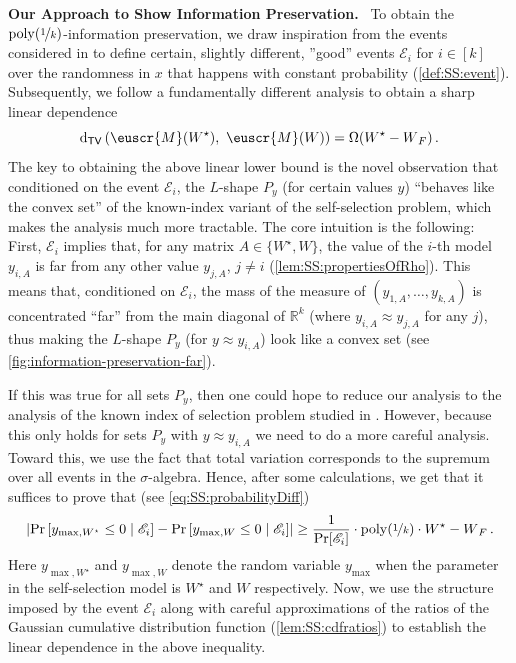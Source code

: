\documentclass[11pt,letterpaper]{article}
\theoremstyle{plain}
\theoremstyle{definition}
\theoremstyle{remark}
\def\abs#1{\left| #1 \right|}
\newcommand{\inparen}[1]{\ensuremath{\left(#1\right)}}
\newcommand{\insquare}[1]{\ensuremath{\left[#1\right]}}
\let\norm\relax
\newcommand{\norm}[1]{\ensuremath{\left\lVert #1 \right\rVert}}
\newcommand{\R}{\mathbb{R}}
\newcommand{\evE}{\ensuremath{\mathscr{E}}}
\newcommand{\tv}[2]{\operatorname{d}_{\mathsf{TV}}{\inparen{#1,#2}}}
\newcommand{\nfrac}[2]{\nicefrac{#1}{#2}}
\newcommand{\poly}{\mathrm{poly}}
\newcommand{\customcal}[1]{\euscr{#1}}
\newcommand{\cM}{\customcal{M}}
\renewcommand{\paragraph}[1]{\medskip \noindent\textbf{#1}~}
\newcommand{\Wstar}{{W^\star}}
\newcommand{\ymax}{y_{\max}}
\begin{document}
    \paragraph{Our Approach to Show Information Preservation.}
    To obtain the $\poly(\nfrac{1}{k})$-information preservation, 
    we draw inspiration from the events considered in \cite{gaitonde2024selfselection} to define certain, slightly different, ''good'' events $\evE_i$ for $i\in [k]$
    over the randomness in $x$ that happens with constant probability (\cref{def:SS:event}).
    Subsequently, we follow a fundamentally different analysis to obtain a sharp linear dependence
    \[
        \tv{\cM(\Wstar)}{~\cM(W)}=\Omega(\norm{\Wstar-W}_F)\,.
    \]
    {The key to obtaining the above linear lower bound is the novel observation that conditioned} on the event $\evE_i$, 
    the $L$-shape $P_y$ {(for certain values $y$)} ``behaves like the convex set'' of the known-index variant of the self-selection problem, which makes the analysis much more tractable.
  {The core intuition} is the following:
    First, $\evE_i$ implies that, for any matrix $A \in \{W^\star, W\}$, 
    the value of the $i$-th model $y_{i, A}$ is far from any other value $y_{j, A}$, $j \neq i$ (\cref{lem:SS:propertiesOfRho}). 
    This means that, conditioned on $\evE_i$, the mass of the measure of $(y_{1,A},\dots,y_{k,A})$ is concentrated ``far'' from the main diagonal of $\R^k$ (where $y_{i,A} \approx y_{j,A}$ for any $j$), thus making the $L$-shape {$P_y$ (for $y\approx y_{i, A}$)}  look like a convex set (see \cref{fig:information-preservation-far}).
    
    {If this was true for all sets $P_y$, then one could hope to reduce our analysis to the analysis of the known index of selection problem studied in \cite{cherapanamjeri2023selfselection}.
    However, because this only holds for sets $P_y$ with  $y\approx y_{i, A}$ we need to do a more careful analysis.}
    {Toward this,} we use the fact that total variation corresponds to the supremum over all events in the $\sigma$-algebra. 
    Hence, {after some calculations,} we get that it suffices to prove that (see \cref{eq:SS:probabilityDiff})
    \[
       \abs{
                \Pr\insquare{y_{\max, W^\star} \leq 0\mid \evE_i}
                -
                \Pr\insquare{y_{\max, W} \leq 0\mid \evE_i}
            }
            \geq 
            \frac{1}{\Pr[\evE_i]}
            \cdot \poly{(\nfrac{1}{k})}
            \cdot {\norm{\Wstar-W}_F}\,.
    \] 
    {Here $y_{\max, W^\star}$ and $y_{\max, W}$ denote the random variable $\ymax$ when the parameter in the self-selection model is $W^\star$ and $W$ respectively.}
    Now, {we use the} structure imposed by the event $\evE_i$ {along with careful} approximations of the {ratios of the} Gaussian cumulative distribution function {(\cref{lem:SS:cdfratios}) to establish the linear dependence in the above inequality}.
        
\end{document}
